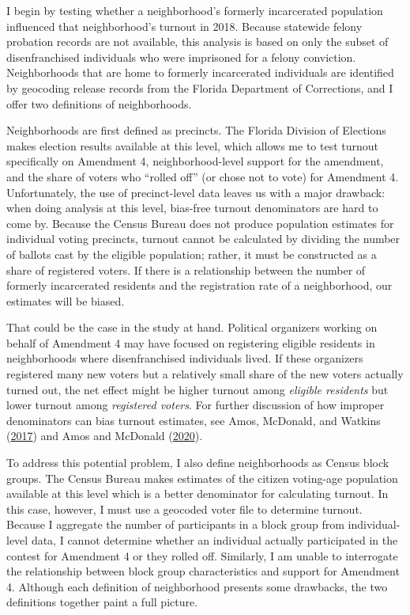 \documentclass[
  12pt,
]{article}
\begin{document}
I begin by testing whether a neighborhood's formerly incarcerated population influenced that neighborhood's turnout in 2018. Because statewide felony probation records are not available, this analysis is based on only the subset of disenfranchised individuals who were imprisoned for a felony conviction. Neighborhoods that are home to formerly incarcerated individuals are identified by geocoding release records from the Florida Department of Corrections, and I offer two definitions of neighborhoods.

Neighborhoods are first defined as precincts. The Florida Division of Elections makes election results available at this level, which allows me to test turnout specifically on Amendment 4, neighborhood-level support for the amendment, and the share of voters who ``rolled off'' (or chose not to vote) for Amendment 4. Unfortunately, the use of precinct-level data leaves us with a major drawback: when doing analysis at this level, bias-free turnout denominators are hard to come by. Because the Census Bureau does not produce population estimates for individual voting precincts, turnout cannot be calculated by dividing the number of ballots cast by the eligible population; rather, it must be constructed as a share of registered voters. If there is a relationship between the number of formerly incarcerated residents and the registration rate of a neighborhood, our estimates will be biased.

That could be the case in the study at hand. Political organizers working on behalf of Amendment 4 may have focused on registering eligible residents in neighborhoods where disenfranchised individuals lived. If these organizers registered many new voters but a relatively small share of the new voters actually turned out, the net effect might be higher turnout among \emph{eligible residents} but lower turnout among \emph{registered voters}. For further discussion of how improper denominators can bias turnout estimates, see Amos, McDonald, and Watkins (\protect\hyperlink{ref-Amos2017}{2017}) and Amos and McDonald (\protect\hyperlink{ref-Amos2020}{2020}).

To address this potential problem, I also define neighborhoods as Census block groups. The Census Bureau makes estimates of the citizen voting-age population available at this level which is a better denominator for calculating turnout. In this case, however, I must use a geocoded voter file to determine turnout. Because I aggregate the number of participants in a block group from individual-level data, I cannot determine whether an individual actually participated in the contest for Amendment 4 or they rolled off. Similarly, I am unable to interrogate the relationship between block group characteristics and support for Amendment 4. Although each definition of neighborhood presents some drawbacks, the two definitions together paint a full picture.
\end{document}

